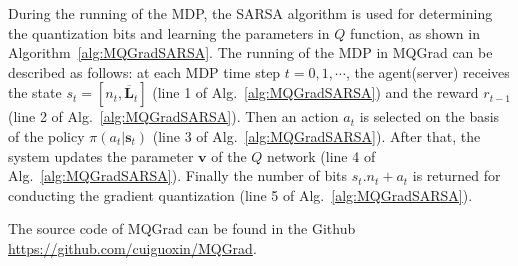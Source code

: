 \documentclass[sigconf]{acmart}
\begin{document}



During the running of the MDP, the SARSA algorithm is used for determining the quantization bits and learning the parameters in $Q$ function, as shown in Algorithm~\ref{alg:MQGradSARSA}. The running of the MDP in MQGrad can be described as follows: at each MDP time step $t = 0, 1, \cdots $, the agent(server) receives the state ${s}_t=[n_t, \overline{\mathbf{L}}_t]$ (line 1 of Alg.~\ref{alg:MQGradSARSA}) and the reward $r_{t-1}$ (line 2 of Alg.~\ref{alg:MQGradSARSA}). Then an action $a_t$ is selected on the basis of the policy $\pi(a_t|\textbf{s}_t)$ (line 3 of Alg.~\ref{alg:MQGradSARSA}). After that, the system updates the parameter $\textbf{v}$ of the $Q$ network (line 4 of Alg.~\ref{alg:MQGradSARSA}). Finally the number of bits ${s}_t.n_t + a_t$ is returned for conducting the gradient quantization (line 5 of Alg.~\ref{alg:MQGradSARSA}).

The source code of MQGrad can be found in the Github \url{https://github.com/cuiguoxin/MQGrad}.
\end{document}
